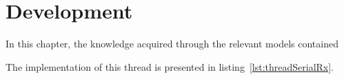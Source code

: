 %
\chapter{Development}
\label{ch:development}
%
In this chapter, the knowledge acquired through the relevant models contained

The implementation of this thread is presented
in listing~\ref{lst:threadSerialRx}.
%
%

%


%

